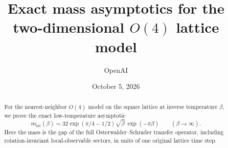 \documentclass[11pt,a4paper]{article}
\title{Exact mass asymptotics for the two-dimensional \texorpdfstring{\(O(4)\)}{O(4)} lattice model}
\author{OpenAI}
\date{October 5, 2026}
\numberwithin{equation}{section}
\theoremstyle{definition}
\theoremstyle{remark}
\begin{document}
\maketitle
\begin{abstract}
For the nearest-neighbor \(O(4)\) model on the square lattice at inverse
temperature \(\beta\), we prove the exact low-temperature asymptotic
\[
 m_{\mathrm{lat}}(\beta)\sim
 32\exp(\pi/4-1/2)\sqrt\beta\,\exp(-\pi\beta)
 \qquad (\beta\to\infty).
\]
Here the mass is the gap of the full Osterwalder--Schrader transfer operator,
including rotation-invariant local-observable sectors, in units of one
original lattice time step.
\end{abstract}
\tableofcontents









\end{document}
